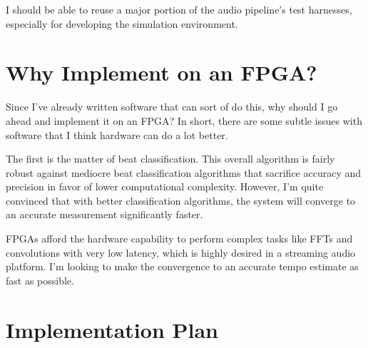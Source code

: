 \documentclass[letterpaper]{article}
\begin{document}
    I should be able to reuse a major portion of the audio pipeline's test
    harnesses, especially for developing the simulation environment.


\section{Why Implement on an FPGA?}

    Since I've already written software that can sort of do this, why should I
    go ahead and implement it on an FPGA?  In short, there are some subtle
    issues with software that I think hardware can do a lot better.

    The first is the matter of beat classification.  This overall algorithm is
    fairly robust against mediocre beat classification algorithms that
    sacrifice accuracy and precision in favor of lower computational
    complexity.  However, I'm quite convinced that with better classification
    algorithms, the system will converge to an accurate measurement
    significantly faster.

    FPGAs afford the hardware capability to perform complex tasks like FFTs and
    convolutions with very low latency, which is highly desired in a streaming
    audio platform.  I'm looking to make the convergence to an accurate tempo
    estimate as fast as possible. 

    
\section{Implementation Plan}
    
\end{document}

